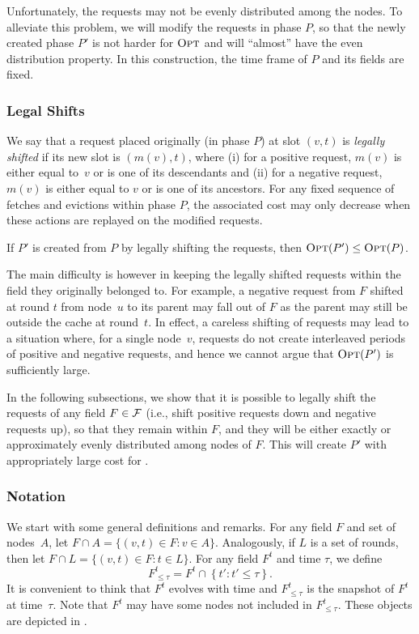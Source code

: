Unfortunately, the requests may not be evenly distributed among the nodes. To
alleviate this problem, we will modify the requests in phase $P$, so that the
newly created phase $P'$ is not harder for $\textsc{Opt}$ and will ``almost'' have the
even distribution property. In this construction, the time frame of $P$ and
its fields are fixed.

\subsubsection{Legal Shifts}

We say that a request placed originally (in phase $P$) at slot $(v,t)$ is
\emph{legally shifted} if its new slot is $(m(v), t)$, where (i) for a
positive request, $m(v)$ is either equal to~$v$ or is one of its descendants
and (ii) for a negative request, $m(v)$ is either equal to $v$ or is one of
its ancestors. For any fixed sequence of fetches and evictions within phase
$P$, the associated cost may only decrease when these actions are replayed on
the modified requests.

\begin{observation}
\label{obs:pprim_easier_than_p}
If $P'$ is created from $P$ by legally shifting the requests, then $\textsc{Opt}(P')
\leq \textsc{Opt}(P)$.
\end{observation}

The main difficulty is however in keeping the legally shifted requests within
the field they originally belonged to. For example, a negative request from
$F$ shifted at round $t$ from node~$u$ to its parent may fall out of $F$ as
the parent may still be outside the cache at round~$t$. In effect, a careless
shifting of requests may lead to a situation where, for a single node~$v$,
requests do not create interleaved periods of positive and negative requests,
and hence we cannot argue that $\textsc{Opt}(P')$ is sufficiently large.

In the following subsections, we show that it is possible to legally shift the
requests of any field $F \in \mathcal{F}$ (i.e., shift positive requests down and negative
requests up), so that they remain within $F$, and they will
be either exactly or approximately evenly distributed among nodes of $F$.
This will create $P'$ with appropriately large cost for \OPT.


\subsubsection{Notation}
%
We start with some general definitions and remarks. For any field $F$ and set
of nodes~$A$, let $F \cap A = \{ (v,t) \in F : v \in A \}$. Analogously, if
$L$ is a set of rounds, then let $F \cap L = \{ (v,t) \in F : t \in L \}$. For
any field $F^t$ and time $\tau$, we define
\[
    F^t_{\leq \tau} = F^t \cap \left\{ t' : t' \leq \tau \right\}.
\]
It is convenient to think that $F^t$ evolves with time and $F^t_{\leq \tau}$
is the snapshot of $F^t$ at time~$\tau$. Note that $F^t$ may have some nodes
not included in $F^t_{\leq \tau}$. These objects are depicted in
.

